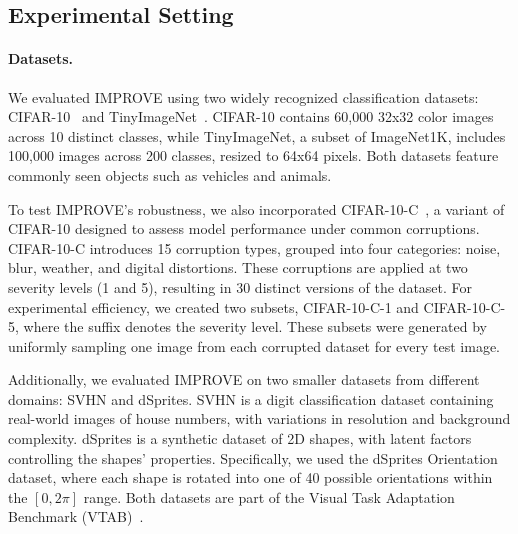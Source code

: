 \label{sec:experiments}
\subsection{Experimental Setting}
\paragraph{Datasets.} 
We evaluated IMPROVE using two widely recognized classification datasets: CIFAR-10~\citep{krizhevsky2009cifar} and TinyImageNet~\citep{deng2009imagenet}. CIFAR-10 contains 60,000 32x32 color images across 10 distinct classes, while TinyImageNet, a subset of ImageNet1K, includes 100,000 images across 200 classes, resized to 64x64 pixels. Both datasets feature commonly seen objects such as vehicles and animals.

To test IMPROVE's robustness, we also incorporated CIFAR-10-C~\citep{hendrycks2019cifar10c}, a variant of CIFAR-10 designed to assess model performance under common corruptions. CIFAR-10-C introduces 15 corruption types, grouped into four categories: noise, blur, weather, and digital distortions. These corruptions are applied at two severity levels (1 and 5), resulting in 30 distinct versions of the dataset. For experimental efficiency, we created two subsets, CIFAR-10-C-1 and CIFAR-10-C-5, where the suffix denotes the severity level. These subsets were generated by uniformly sampling one image from each corrupted dataset for every test image.

Additionally, we evaluated IMPROVE on two smaller datasets from different domains: SVHN and dSprites. SVHN is a digit classification dataset containing real-world images of house numbers, with variations in resolution and background complexity. dSprites is a synthetic dataset of 2D shapes, with latent factors controlling the shapes’ properties. Specifically, we used the dSprites Orientation dataset, where each shape is rotated into one of 40 possible orientations within the $[0, 2\pi]$ range. Both datasets are part of the Visual Task Adaptation Benchmark (VTAB)~\citep{zhai2020vtab}.

